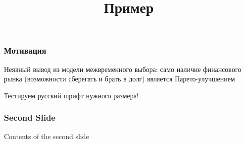 \documentclass[12pt]{beamer}
\title{Пример}
\subtitle{}
\author{}
\date{}
\begin{document}
\maketitle

\begin{frame}
\frametitle{Мотивация}


Неявный вывод из модели межвременного выбора: само наличие финансового рынка 
(возможности сберегать и брать в долг) является Парето-улучшением


Тестируем русский \alert{шрифт нужного} размера!


\end{frame}

\begin{frame}
\frametitle{Second Slide}
Contents of the second slide
\end{frame}
\end{document}
